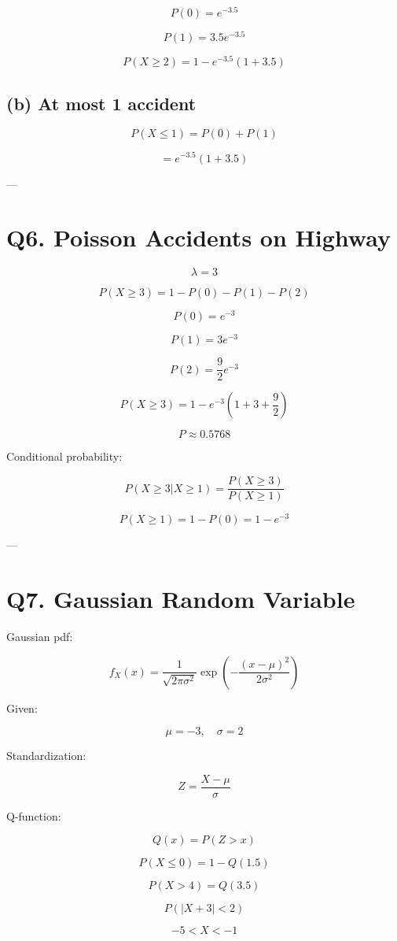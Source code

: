 \documentclass[12pt]{article}
\begin{document}
\[
P(0) = e^{-3.5}
\]

\[
P(1) = 3.5e^{-3.5}
\]

\[
P(X \ge 2) = 1 - e^{-3.5}(1+3.5)
\]

\subsection*{(b) At most 1 accident}

\[
P(X \le 1) = P(0) + P(1)
\]

\[
= e^{-3.5}(1+3.5)
\]

---
\newpage
\section*{Q6. Poisson Accidents on Highway}

\[
\lambda = 3
\]

\[
P(X \ge 3) = 1 - P(0) - P(1) - P(2)
\]

\[
P(0) = e^{-3}
\]

\[
P(1) = 3e^{-3}
\]

\[
P(2) = \frac{9}{2}e^{-3}
\]

\[
P(X \ge 3) = 1 - e^{-3}\left(1+3+\frac{9}{2}\right)
\]

\[
P \approx 0.5768
\]

Conditional probability:

\[
P(X \ge 3 | X \ge 1) =
\frac{P(X \ge 3)}{P(X \ge 1)}
\]

\[
P(X \ge 1) = 1 - P(0) = 1 - e^{-3}
\]

---
\newpage
\section*{Q7. Gaussian Random Variable}

Gaussian pdf:

\[
f_X(x) = \frac{1}{\sqrt{2\pi\sigma^2}} 
\exp\left(-\frac{(x-\mu)^2}{2\sigma^2}\right)
\]

Given:

\[
\mu = -3, \quad \sigma = 2
\]

Standardization:

\[
Z = \frac{X-\mu}{\sigma}
\]

Q-function:

\[
Q(x) = P(Z>x)
\]

\[
P(X \le 0) = 1 - Q(1.5)
\]

\[
P(X > 4) = Q(3.5)
\]

\[
P(|X+3|<2)
\]

\[
-5 < X < -1
\]
\end{document}
